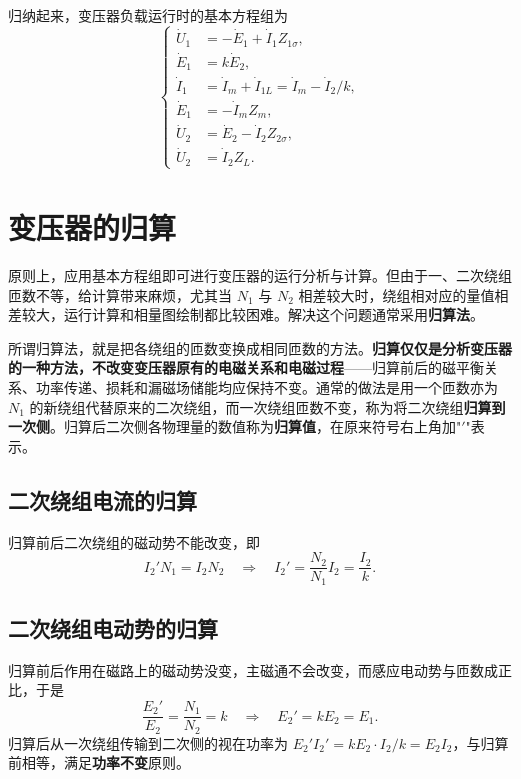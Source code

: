 归纳起来，变压器负载运行时的基本方程组为
\begin{equation}
\left\{
\begin{aligned}
\dot U_1&=-\dot E_1+\dot I_1Z_{1\sigma},\\
\dot E_1&=k\dot E_2,\\
\dot I_1&=\dot I_m+\dot I_{1L}=\dot I_m-\dot I_2/k,\\
\dot E_1&=-\dot I_mZ_m,\\
\dot U_2&=\dot E_2-\dot I_2Z_{2\sigma},\\
\dot U_2&=\dot I_2Z_L .
\end{aligned}
\right.
\end{equation}


\section{变压器的归算}

原则上，应用基本方程组即可进行变压器的运行分析与计算。但由于一、二次绕组匝数不等，给计算带来麻烦，尤其当 $N_1$ 与 $N_2$ 相差较大时，绕组相对应的量值相差较大，运行计算和相量图绘制都比较困难。解决这个问题通常采用\textbf{归算法}。

所谓归算法，就是把各绕组的匝数变换成相同匝数的方法。\textbf{归算仅仅是分析变压器的一种方法，不改变变压器原有的电磁关系和电磁过程}——归算前后的磁平衡关系、功率传递、损耗和漏磁场储能均应保持不变。通常的做法是用一个匝数亦为 $N_1$ 的新绕组代替原来的二次绕组，而一次绕组匝数不变，称为将二次绕组\textbf{归算到一次侧}。归算后二次侧各物理量的数值称为\textbf{归算值}，在原来符号右上角加"$'$"表示。

\subsection{二次绕组电流的归算}
归算前后二次绕组的磁动势不能改变，即
\begin{equation}
I_2'N_1=I_2N_2\quad\Longrightarrow\quad
I_2'=\frac{N_2}{N_1}I_2=\frac{I_2}{k}.
\end{equation}

\subsection{二次绕组电动势的归算}
归算前后作用在磁路上的磁动势没变，主磁通不会改变，而感应电动势与匝数成正比，于是
\begin{equation}
\frac{E_2'}{E_2}=\frac{N_1}{N_2}=k\quad\Longrightarrow\quad
E_2'=kE_2=E_1 .
\end{equation}
归算后从一次绕组传输到二次侧的视在功率为 $E_2'I_2'=kE_2\cdot I_2/k=E_2I_2$，与归算前相等，满足\textbf{功率不变}原则。

